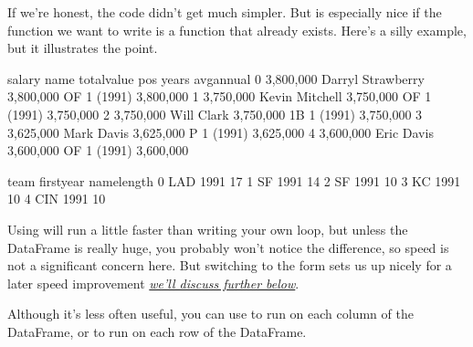 \documentclass[letterpaper,10pt,english]{sphinxmanual}
\begin{document}
If we’re honest, the code didn’t get  much simpler.  But  is especially nice if the function we want to write is a function that already exists.  Here’s a silly example, but it illustrates the point.

\begin{sphinxVerbatim}[commandchars=\\\{\}]
\PYG{p}{[}\PYG{p}{]}  \PYG{p}{[}\PYG{p}{]}  
\end{sphinxVerbatim}

\begin{sphinxVerbatim}[commandchars=\\\{\}]
        salary               name  total\PYGZus{}value pos     years   avg\PYGZus{}annual  \PYGZbs{}
0  \PYGZdl{} 3,800,000  Darryl Strawberry  \PYGZdl{} 3,800,000  OF  1 (1991)  \PYGZdl{} 3,800,000   
1  \PYGZdl{} 3,750,000     Kevin Mitchell  \PYGZdl{} 3,750,000  OF  1 (1991)  \PYGZdl{} 3,750,000   
2  \PYGZdl{} 3,750,000         Will Clark  \PYGZdl{} 3,750,000  1B  1 (1991)  \PYGZdl{} 3,750,000   
3  \PYGZdl{} 3,625,000         Mark Davis  \PYGZdl{} 3,625,000   P  1 (1991)  \PYGZdl{} 3,625,000   
4  \PYGZdl{} 3,600,000         Eric Davis  \PYGZdl{} 3,600,000  OF  1 (1991)  \PYGZdl{} 3,600,000   

  team  first\PYGZus{}year  name\PYGZus{}length  
0  LAD        1991           17  
1   SF        1991           14  
2   SF        1991           10  
3   KC        1991           10  
4  CIN        1991           10  
\end{sphinxVerbatim}

Using  will run a little faster than writing your own loop, but unless the DataFrame is really huge, you probably won’t notice the difference, so speed is not a significant concern here.  But switching to the  form sets us up nicely for a later speed improvement {\hyperref[\detokenize{chapter-11-processing-rows:parallel-apply}]{\emph{we’ll discuss further below}}}.

Although it’s less often useful, you can use  to run  on each column of the DataFrame, or  to run  on each row of the DataFrame.
\end{document}

